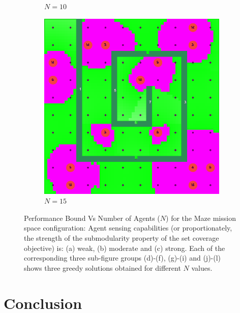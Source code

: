 \documentclass[conference]{IEEEtran}
\begin{document}
\begin{figure}[t]
\begin{subfigure}[t]{0.10\textwidth}
        \caption{$N=10$}
    \end{subfigure}\hfill
    \begin{subfigure}[t]{0.10\textwidth}
        \centering
        \includegraphics[width=\textwidth]{Figures/Maze2_3.png}
        \caption{$N=15$}
    \end{subfigure}
    \caption{Performance Bound Vs Number of Agents ($N$) for the Maze mission space configuration: Agent sensing capabilities (or proportionately, the strength of the submodularity property of the set coverage objective) is: (a) weak, (b) moderate and (c) strong. Each of the corresponding three sub-figure groups (d)-(f), (g)-(i) and (j)-(l) shows three greedy solutions obtained for different $N$ values.}
    \label{Fig:MazeConfigBetaVsN}
\end{figure}





\section{Conclusion}
\label{Sec:Conclusion}
\end{document}
